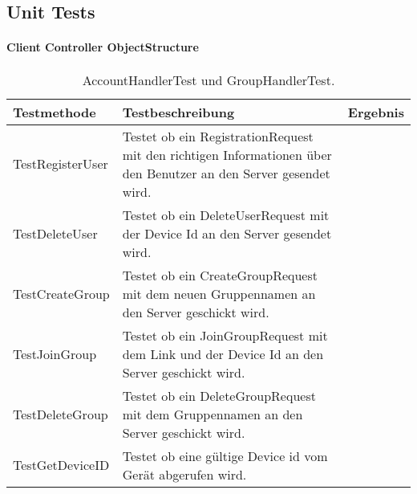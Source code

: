 \subsection{Unit Tests}
	\paragraph{Client Controller ObjectStructure}
	\begin{table}[H]
		{
			\begin{tabular}{|p{}|p{}|>{\centering}p{}|}
				\hline
				Testmethode & Testbeschreibung & Ergebnis\tabularnewline
				\hline
				\hspace{0pt}TestRegisterUser & Testet ob ein RegistrationRequest mit den richtigen Informationen über den Benutzer an den Server gesendet wird. &			\checkmark\tabularnewline
				\hspace{0pt}TestDeleteUser & Testet ob ein DeleteUserRequest mit der Device Id an den Server gesendet wird. & \checkmark\tabularnewline		
				\hspace{0pt}TestCreateGroup & Testet ob ein CreateGroupRequest mit dem neuen Gruppennamen an den Server geschickt wird. & \checkmark\tabularnewline
				\hspace{0pt}TestJoinGroup & Testet ob ein JoinGroupRequest mit dem Link und der Device Id an den Server geschickt wird. & \checkmark\tabularnewline
				\hspace{0pt}TestDeleteGroup & Testet ob ein DeleteGroupRequest mit dem Gruppennamen an den Server geschickt wird. & \checkmark\tabularnewline
				\hspace{0pt}TestGetDeviceID & Testet ob eine gültige Device id vom Gerät abgerufen wird. & \checkmark\tabularnewline
				\hline
			\end{tabular}}
		\caption{AccountHandlerTest und GroupHandlerTest.}
	\end{table}
	
	
